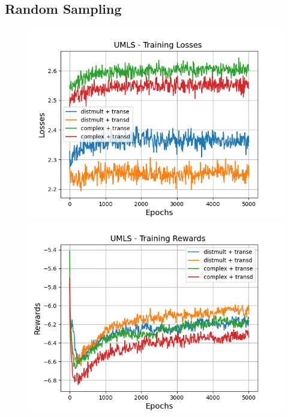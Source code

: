 \subsection{Random Sampling}

\begin{figure}
    \centering
    \begin{minipage}{.5\textwidth}
      \centering
      \includegraphics[width=0.9\linewidth]{figures/results/gan_train/pretrained/random/umls/gan_train_random_umls_losses.png}
    \end{minipage}%
    \begin{minipage}{.5\textwidth}
      \centering
      \includegraphics[width=0.9\linewidth]{figures/results/gan_train/pretrained/random/umls/gan_train_random_umls_rewards.png}
    \end{minipage}
    \begin{minipage}{.5\textwidth}

\end{minipage}
\end{figure}

